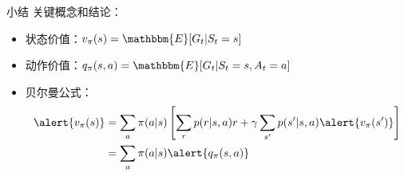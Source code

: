 \begin{frame}{小结}
    关键概念和结论：
    \begin{itemize}
        \item 状态价值：$v_\pi(s)=\mathbbm{E}[G_t|S_t=s]$
        \item 动作价值：$q_\pi(s,a)=\mathbbm{E}[G_t|S_t=s,A_t=a]$
        \item 贝尔曼公式：
        \[
            \begin{aligned}
                \alert{v_\pi(s)}&=\sum_a\pi(a|s)\left[\sum_r p(r|s,a)r+\gamma\sum_{s'}p(s'|s,a)\alert{v_{\pi}(s')}\right] \\
                &=\sum_a\pi(a|s)\alert{q_\pi(s,a)}
            \end{aligned}
        \]
    \end{itemize}
\end{frame}
